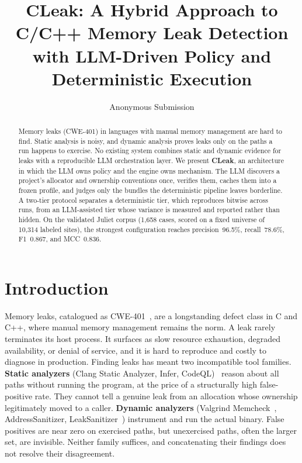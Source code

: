 \documentclass[a4paper]{llncs}
\title{CLeak: A Hybrid Approach to C/C++ Memory Leak Detection with LLM-Driven Policy and Deterministic Execution}
\author{Anonymous Submission}
\institute{}
\begin{document}
\maketitle

\begin{abstract}
Memory leaks (CWE-401) in languages with manual memory management are hard
to find. Static analysis is noisy, and dynamic analysis proves leaks only on
the paths a run happens to exercise. No existing system combines static and
dynamic evidence for leaks with a reproducible LLM orchestration layer. We
present \textbf{CLeak}, an architecture in which the LLM owns policy and the
engine owns mechanism. The LLM discovers a project's allocator and ownership
conventions once, verifies them, caches them into a frozen profile, and judges
only the bundles the deterministic pipeline leaves borderline. A two-tier
protocol separates a deterministic tier, which reproduces bitwise across
runs, from an LLM-assisted tier whose variance is measured and reported
rather than hidden. On the validated Juliet corpus (1{,}658 cases, scored on
a fixed universe of 10{,}314 labeled sites), the strongest configuration
reaches precision~96.5\%, recall~78.6\%, F1~0.867, and MCC~0.836.
\end{abstract}

\section{Introduction}
\label{sec:intro}

Memory leaks, catalogued as CWE-401~\cite{cwe401}, are a longstanding defect class
in C and C++, where manual memory management remains the norm. A leak
rarely terminates its host process. It surfaces as slow resource
exhaustion, degraded availability, or denial of service, and it is hard
to reproduce and costly to diagnose in production. Finding leaks has
meant two incompatible tool families.
\textbf{Static analyzers} (Clang Static Analyzer, Infer, CodeQL)~\cite{clangsa,infer,codeql} reason
about all paths without running the program, at the price of a
structurally high false-positive rate. They cannot tell a genuine leak
from an allocation whose ownership legitimately moved to a caller.
\textbf{Dynamic analyzers} (Valgrind Memcheck~\cite{valgrind}, AddressSanitizer,
LeakSanitizer~\cite{asan}) instrument and run the actual binary. False
positives are near zero on exercised paths, but unexercised paths, often
the larger set, are invisible. Neither family suffices, and
concatenating their findings does not resolve their disagreement.
\end{document}
